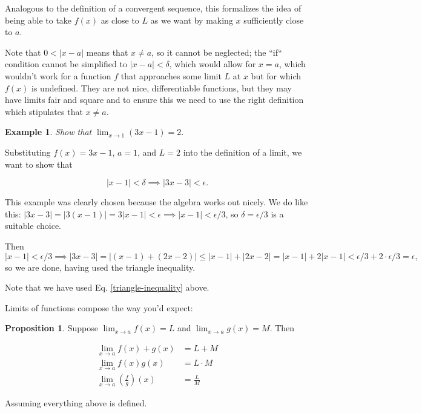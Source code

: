 \documentclass{article}
\theoremstyle{definition}
\newtheorem{example}{Example}[section]
\newtheorem{proposition}{Proposition}[section]
\begin{document}
Analogous to the definition of a convergent sequence, this formalizes the idea of being able to take $f(x)$ as close to $L$ as we want
by making $x$ sufficiently close to $a$.

Note that $0 < |x-a|$ means that $x \neq a$, so it cannot be neglected; the ``if`` condition cannot be simplified to $|x -a | < \delta$, which would allow for $x = a$, which wouldn't work for a function $f$ that approaches some limit $L$ at $x$ but for which $f(x)$ is undefined. They are not nice, differentiable functions, but they may have limits fair and square and to ensure this we need to use the right definition which stipulates that $x \neq a$.

\begin{example} 

\emph{Show that $\lim_{x \to 1} (3x-1) = 2$}.

Substituting $f(x) = 3x-1$, $a = 1$, and $L = 2$ into the definition of a limit,
we want to show that

\begin{equation*}
|x - 1| < \delta \implies |3x - 3| < \epsilon.
\end{equation*}

This example was clearly chosen because the algebra works out nicely. We do like this: $|3x-3| = |3(x-1)| = 3|x-1| < \epsilon \implies |x-1| <
\epsilon/3$, so $\delta = \epsilon/3$ is a suitable choice.

Then $|x - 1| < \epsilon/3 \implies |3x-3| = |(x - 1) + (2x-2)| \leq |x-1| +
|2x-2| = |x-1| + 2|x-1| < \epsilon/3 + 2 \cdot \epsilon/3 = \epsilon,$ so we are
done, having used the triangle inequality.

Note that we have used Eq. \ref{triangle-inequality} above.
 
\end{example}

Limits of functions compose the way you'd expect:
\begin{proposition}
Suppose $\lim_{x \to a} f(x) = L$ and $\lim_{x \to a} g(x) = M$. Then

\begin{align*}
\lim_{x \to a} f(x) + g(x) & = L + M \\
\lim_{x \to a} f(x)g(x) & = L \cdot M \\
\lim_{x \to a} \left(\frac{f}{g}\right)(x) & = \frac{L}{M}
\end{align*}

Assuming everything above is defined.

\end{proposition}
\end{document}
